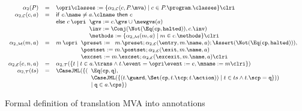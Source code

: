 \begin{figure}[t]
\[{\small
\begin{array}{rcl}
\alpha_2(P) & = &\opri \classes :=
\{\alpha_{2, \mathcal{C}}(c, P.\mva) \mid c \in P.\program.\classes\} \clri\\

\alpha_{2,\mathcal{C}}(c, a) & = &
\mathsf{if\ }c.\name \not = a.\clname \mathsf{\ then\ }c\\
&&
\mathsf{else\ }c \:\opri
 \begin{array}[t]{l}
 \gvs := c.\gvs \cup \newgvs(a)\\
 \inv := \Conj(\Not(\Eq(\texttt{cp}, \texttt{halted})), c.\inv)\\
 \methods := \{\alpha_{2,\mathcal{M}}(m, a) \mid m \in c.\methods\} \clri
\end{array}\\
\alpha_{2,\mathcal{M}}(m, a) & = & m \: \opri
  \begin{array}[t]{l}
  \preset := \begin{array}[t]{l}
             m.\preset; \alpha_{2,\mathcal{E}}(\entry, m.\name, a);
             \Assert(\Not(\Eq(\texttt{cp}, \texttt{halted}))),
             \end{array}\\
  \postset := m.\postset; \alpha_{2, \mathcal{E}}(\exit, m.\name, a)\\
  \excset := m.\excset; \alpha_{2, \mathcal{E}}(\excexit, m.\name, a)
  \clri
  \end{array}\\
\alpha_{2, \mathcal{E}}(e, n, a) & = &
  \alpha_{2, \mathcal{T}}(\{t \mid t \in a.\trans \wedge
                                   t.\event = \opri \event := e,
                                                    \mname := m \clri
                           \})\\
\alpha_{2, \mathcal{T}}(ts) & = &
  \CaseJML(
    \{(\begin{array}[t]{l}
       \Eq(\texttt{cp}, \texttt{q}),\\
       \CaseJML(\{(t.\guard, \Set(\texttt{cp}, t.\tcp; t.\action)) \mid
                  t \in ts \wedge t.\scp = \texttt{q}
               \}))\\
    \mid \texttt{q} \in a.\cps
    \})
    \end{array}
\end{array}}
\]
\caption{Formal definition of translation MVA into annotations}
\label{FigMVAtoAnnot}
\end{figure}



